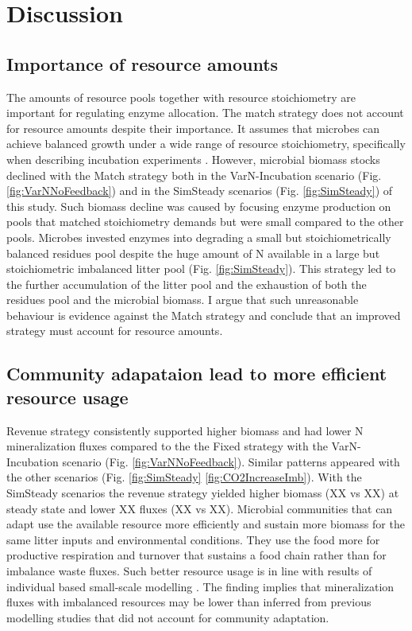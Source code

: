 \section{Discussion}
\subsection{Importance of resource amounts}
The amounts of resource pools together with resource stoichiometry are
important for regulating enzyme allocation. The match strategy does not account
for resource amounts despite their importance. It assumes that microbes can
achieve balanced growth under a wide range of resource stoichiometry,
specifically when describing incubation experiments \citep{Moorhead12,
Ballantyne14}. However, microbial biomass stocks declined with the Match
strategy both in the VarN-Incubation scenario (Fig. \ref{fig:VarNNoFeedback})
and in the SimSteady scenarios (Fig. \ref{fig:SimSteady}) of this study. Such
biomass decline was caused by focusing enzyme production on pools that matched
stoichiometry demands but were small compared to the other pools. Microbes
invested enzymes into degrading a small but stoichiometrically
balanced residues pool despite the huge amount of N available in a large but
stoichiometric imbalanced litter pool (Fig.
\ref{fig:SimSteady}). This strategy led to the further accumulation of the
litter pool and the exhaustion of both the residues pool and the microbial
biomass. I argue that such unreasonable behaviour is evidence against the Match
strategy and conclude that an improved strategy must account for resource
amounts.

\subsection{Community adapataion lead to more efficient resource usage} 
Revenue strategy consistently supported higher biomass and had
lower N mineralization fluxes compared to the the Fixed strategy with the
VarN-Incubation scenario (Fig. \ref{fig:VarNNoFeedback}). Similar patterns
appeared with the other scenarios (Fig. \ref{fig:SimSteady}
\ref{fig:CO2IncreaseImb}). With the SimSteady scenarios the revenue strategy
yielded higher biomass (XX vs XX) at steady state and lower XX fluxes (XX vs
XX).
Microbial communities that can adapt use
the available resource more efficiently and sustain more biomass for the same litter inputs and
environmental conditions. They use the food more for productive respiration and
turnover that sustains a food chain rather than for imbalance waste fluxes.
Such better resource usage is in line with results of individual based
small-scale modelling \citep{Kaiser14}.
 The finding implies that mineralization fluxes with imbalanced resources may
be lower than inferred from previous modelling studies that did not account for community
adaptation.

